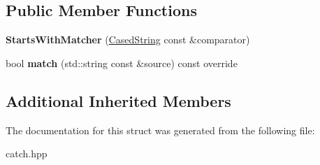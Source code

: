 \subsection*{Public Member Functions}
\begin{DoxyCompactItemize}
\item 
{\bfseries Starts\+With\+Matcher} (\hyperlink{structCatch_1_1Matchers_1_1StdString_1_1CasedString}{Cased\+String} const \&comparator)\hypertarget{structCatch_1_1Matchers_1_1StdString_1_1StartsWithMatcher_a7b86f258bdbd131a6e7bcd94a8977325}{}\label{structCatch_1_1Matchers_1_1StdString_1_1StartsWithMatcher_a7b86f258bdbd131a6e7bcd94a8977325}

\item 
bool {\bfseries match} (std\+::string const \&source) const override\hypertarget{structCatch_1_1Matchers_1_1StdString_1_1StartsWithMatcher_a7da4747aed0c48989d8be59a89e2b7fb}{}\label{structCatch_1_1Matchers_1_1StdString_1_1StartsWithMatcher_a7da4747aed0c48989d8be59a89e2b7fb}

\end{DoxyCompactItemize}
\subsection*{Additional Inherited Members}


The documentation for this struct was generated from the following file\+:\begin{DoxyCompactItemize}
\item 
catch.\+hpp\end{DoxyCompactItemize}
